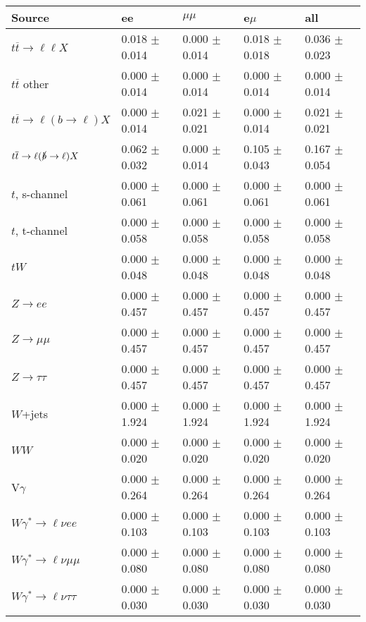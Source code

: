 \begin{tabular}{l | l l l l}
\hline\hline
 Source  &  ee  &  $\mu\mu$  &  e$\mu$  &  all \\
\hline
$t\overline{t}\rightarrow \ell\ell X$ &  0.018 $\pm$  0.014 &  0.000 $\pm$  0.014 &  0.018 $\pm$  0.018 &  0.036 $\pm$  0.023\\
$t\overline{t}$ other &  0.000 $\pm$  0.014 &  0.000 $\pm$  0.014 &  0.000 $\pm$  0.014 &  0.000 $\pm$  0.014\\
$t\overline{t}\rightarrow \ell(b\rightarrow \ell)X$ &  0.000 $\pm$  0.014 &  0.021 $\pm$  0.021 &  0.000 $\pm$  0.014 &  0.021 $\pm$  0.021\\
$t\overline{t}\rightarrow \ell(\slashed{b}\rightarrow \ell)X$ &  0.062 $\pm$  0.032 &  0.000 $\pm$  0.014 &  0.105 $\pm$  0.043 &  0.167 $\pm$  0.054\\
\hline
$t$, s-channel &  0.000 $\pm$  0.061 &  0.000 $\pm$  0.061 &  0.000 $\pm$  0.061 &  0.000 $\pm$  0.061\\
$t$, t-channel &  0.000 $\pm$  0.058 &  0.000 $\pm$  0.058 &  0.000 $\pm$  0.058 &  0.000 $\pm$  0.058\\
$tW$ &  0.000 $\pm$  0.048 &  0.000 $\pm$  0.048 &  0.000 $\pm$  0.048 &  0.000 $\pm$  0.048\\
\hline
$Z\rightarrow ee$ &  0.000 $\pm$  0.457 &  0.000 $\pm$  0.457 &  0.000 $\pm$  0.457 &  0.000 $\pm$  0.457\\
$Z\rightarrow\mu\mu$ &  0.000 $\pm$  0.457 &  0.000 $\pm$  0.457 &  0.000 $\pm$  0.457 &  0.000 $\pm$  0.457\\
$Z\rightarrow\tau\tau$ &  0.000 $\pm$  0.457 &  0.000 $\pm$  0.457 &  0.000 $\pm$  0.457 &  0.000 $\pm$  0.457\\
$W$+jets &  0.000 $\pm$  1.924 &  0.000 $\pm$  1.924 &  0.000 $\pm$  1.924 &  0.000 $\pm$  1.924\\
$WW$ &  0.000 $\pm$  0.020 &  0.000 $\pm$  0.020 &  0.000 $\pm$  0.020 &  0.000 $\pm$  0.020\\
\hline
V$\gamma$ &  0.000 $\pm$  0.264 &  0.000 $\pm$  0.264 &  0.000 $\pm$  0.264 &  0.000 $\pm$  0.264\\
$W\gamma^{*}\rightarrow\ell\nu e e$ &  0.000 $\pm$  0.103 &  0.000 $\pm$  0.103 &  0.000 $\pm$  0.103 &  0.000 $\pm$  0.103\\
$W\gamma^{*}\rightarrow\ell\nu\mu\mu$ &  0.000 $\pm$  0.080 &  0.000 $\pm$  0.080 &  0.000 $\pm$  0.080 &  0.000 $\pm$  0.080\\
$W\gamma^{*}\rightarrow\ell\nu\tau\tau$ &  0.000 $\pm$  0.030 &  0.000 $\pm$  0.030 &  0.000 $\pm$  0.030 &  0.000 $\pm$  0.030\\

\end{tabular}
